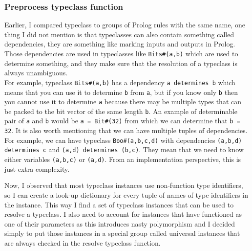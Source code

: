 \documentclass[12pt]{report}
\begin{document}
\subsubsection{Preprocess typeclass function}
Earlier, I compared typeclass to groups of Prolog rules with the same name, one thing I did not mention is that typeclasses can also contain something called dependencies, they are something like marking inputs and outputs in Prolog. Those dependencies are used in typeclasses like \verb!Bits#(a,b)! which are used to determine something, and they make sure that the resolution of a typeclass is always unambiguous. \\ 
For example, typeclass \verb!Bits#(a,b)! has a dependency \verb!a determines b! which means that you can use it to determine \verb!b! from \verb!a!, but if you know only \verb!b! then you cannot use it to determine \verb!a! because there may be multiple types that can be packed to the bit vector of the same length \verb!b!. An example of determinable pair of \verb!a! and \verb!b! would be  \verb!a = Bit#(32)! from which we can determine that \verb!b = 32!. It is also worth mentioning that we can have multiple tuples of dependencies. For example, we can have typeclass \verb!Boo#(a,b,c,d)! with dependencies \verb!(a,b,d) determines c! and \verb!(a,d) determines (b,c)!. They mean that we need to know either variables \verb!(a,b,c)! or \verb!(a,d)!. From an implementation perspective, this is just extra complexity.   
\par  
Now, I observed that most typeclass instances use non-function type identifiers, so I can create a look-up dictionary for every tuple of names of type identifiers in the instance. This way I find a set of typeclass instances that can be used to resolve a typeclass. I also need to account for instances that have functioned as one of their parameters as this introduces nasty polymorphism and I decided simply to put those instances in a special group called universal instances that are always checked in the resolve typeclass function.  
\end{document}
